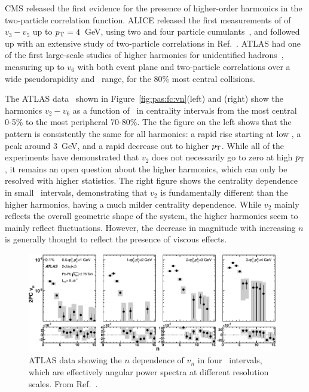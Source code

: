 CMS released the first evidence for the presence of higher-order harmonics in the two-particle
correlation function.  ALICE released the first measurements of of $v_3-v_5$ up to $\mbox{$p_{\mathrm{T}}$}=4$~GeV,
using two and four particle cumulants~\cite{ALICE:2011ab}, and followed up with an extensive study of two-particle
correlations in Ref.~\cite{Aamodt:2011by}.
ATLAS had one of the first large-scale studies of higher harmonics
for unidentified hadrons~\cite{ATLAS:2012at}, measuring up to $v_6$ with both event plane
and two-particle correlations over a wide pseudorapidity and \pT\
range, for the 80\% most central collisions.

The ATLAS data~\cite{ATLAS:2012at} shown in
Figure~\ref{fig:pas:fc:vn}(left) and (right) show the harmonics $v_2 -
v_6$ as a function of \pT\ in centrality intervals from the most
central 0-5\% to the most peripheral 70-80\%.  The the figure on the
left shows that the pattern is consistently the same for all
harmonics: a rapid rise starting at low \pT, a peak around 3~GeV, and
a rapid decrease out to higher $\mbox{$p_{\mathrm{T}}$}$.  While all of the experiments
have demonstrated that $v_2$ does not necessarily go to zero at high
$\mbox{$p_{\mathrm{T}}$}$, it remains an open question about the higher harmonics, which
can only be resolved with higher statistics.  The right figure shows
the centrality dependence in small \pT\ intervals, demonstrating that
$v_2$ is fundamentally different than the higher harmonics, having a
much milder centrality dependence.  While $v_2$ mainly reflects the
overall geometric shape of the system, the higher harmonics seem to
mainly reflect fluctuations.  However, the decrease in magnitude with
increasing $n$ is generally thought to reflect the presence of viscous
effects.

\begin{figure}[!tb]
\begin{center}
\includegraphics[width=0.98\textwidth]{flowcorrelations_figs/atlas_vn_fig_13.pdf}
\caption[]{
ATLAS data showing the $n$ dependence of $v_n$ in four \pT\ intervals, which are effectively
angular power spectra at different resolution scales.  From Ref.~\cite{ATLAS:2012at}.
}
\label{fig:pas:fc:powerspec}
\end{center}
\end{figure}

